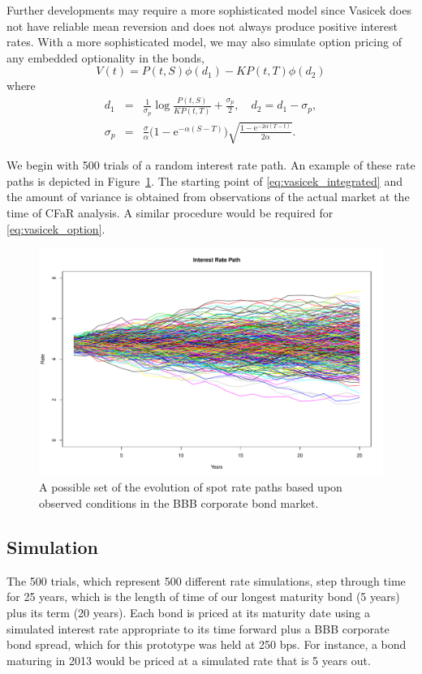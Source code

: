 \documentclass[11pt,twoside]{article}
\numberwithin{equation}{section}
\begin{document}
Further developments may require a more sophisticated model since Vasicek does not have reliable mean reversion and does not always produce positive interest rates. With a more sophisticated model, we may also simulate option pricing of any embedded optionality in the bonds,
\begin{equation}
V(t)=P(t,S) \phi(d_1)- K P(t,T) \phi(d_2)
\label{eq:vasicek_option}
\end{equation}
where
\begin{eqnarray*}
d_1 &=& \frac{1}{\sigma_p} \log \frac{P(t,S)}{KP(t,T)} + \frac{\sigma_p}{2}, \quad d_2=d_1-\sigma_p, \\
\sigma_p &=& \frac{\sigma}{\alpha} \big(1-\text{e}^{-\alpha(S-T)} \big) \sqrt{\frac{1-\text{e}^{-2 \alpha(T-t)}}{2\alpha}}.
\end{eqnarray*}

We begin with 500 trials of a random interest rate path. An example of these rate paths is depicted in Figure~\ref{figure:rate_path_set}. The starting point of \eqref{eq:vasicek_integrated} and the amount of variance is obtained from observations of the actual market at the time of CFaR analysis. A similar procedure would be required for \eqref{eq:vasicek_option}.
\begin{figure}[tbh]
  \centering
  \includegraphics[scale=.5]{rate_path_set}
  \caption{A possible set of the evolution of spot rate paths based upon observed conditions in the BBB corporate bond market.}
  \label{figure:rate_path_set}
\end{figure}

\subsection{Simulation}\label{simulation}
The 500 trials, which represent 500 different rate simulations, step through time for 25 years, which is the length of time of our longest maturity bond (5 years) plus its term (20 years). Each bond is priced at its maturity date using a simulated interest rate appropriate to its time forward plus a BBB corporate bond spread, which for this prototype was held at 250 bps. For instance, a bond maturing in 2013 would be priced at a simulated rate that is 5 years out.
\end{document}
